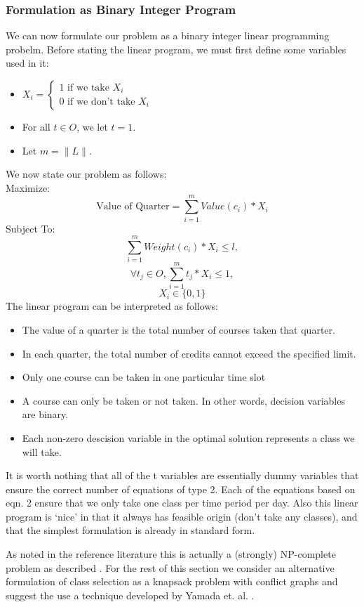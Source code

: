 \documentclass[11pt]{article} %
\begin{document}
\subsubsection{Formulation as Binary Integer Program}
We can now formulate our problem as a binary integer linear programming probelm. Before stating the linear program, we must first define some variables used in it: \\
\begin{itemize}
\item $
  X_i = \left\{
     \begin{array}{lr}
       1 \text{ if we take } X_i\\
       0 \text{ if we don't take } X_i
     \end{array}
   \right. $
\item For all $t \in O$, we let $t = 1$.
\item Let $m = \|L\|$.
\end{itemize}
We now state our problem as follows:\\
Maximize:
$$
\text{Value of Quarter} = \sum_{i=1}^m Value(c_i) * X_i
$$
Subject To:
$$
\sum_{i=1}^m Weight(c_i) * X_i \leq l,
$$
$$
\forall t_j \in O, \sum_{i=1}^m t_j * X_i \leq 1,
$$
$$
X_i \in \{0, 1\}
$$
The linear program can be interpreted as follows:
\begin{itemize}
\item The value of a quarter is the total number of courses taken that quarter.
\item In each quarter, the total number of credits cannot exceed the specified limit.
\item Only one course can be taken in one particular time slot
\item A course can only be taken or not taken. In other words, decision variables are binary.
\item Each non-zero descision variable in the optimal solution represents a class we will take.
\end{itemize}

It is worth nothing that all of the t variables are essentially dummy variables that ensure the correct number of equations of type 2. Each of the equations based on eqn. 2 ensure that we only take one class per time period per day. Also this linear program is ‘nice’ in that it always has feasible origin (don’t take any classes), and that the simplest formulation is already in standard form.

As noted in the reference literature this is actually a (strongly) NP-complete problem as described \cite{pferschy:kcg}. For the rest of this section we consider an alternative formulation of class selection as a knapsack problem with conflict graphs and suggest the use a technique developed by Yamada et. al. \cite{yamada:heuristic}.
\end{document}
